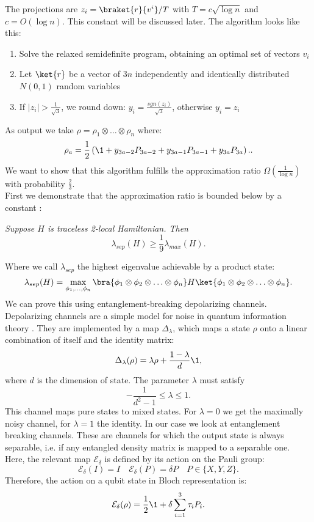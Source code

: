 The projections are $z_i=\braket{r}{v^i}/T$ with $T=c\sqrt{\log{}n}$ and $c=O(\log{}n)$.
This constant will be discussed later.
The algorithm looks like this:
\begin{enumerate}
	\item Solve the relaxed semidefinite program, obtaining an optimal set of vectors $v_i$
	\item Let $\ket{r}$ be a vector of $3n$ independently and identically distributed $N(0,1)$ random variables
	\item If $|z_i|>\frac{1}{\sqrt{3}}$, we round down: $y_i=\frac{sgn(z_i)}{\sqrt{3}}$, otherwise $y_i=z_i$
\end{enumerate}
As output we take $ \rho=\rho_1\otimes\ldots\otimes\rho_n$ where:\[
	\rho_a=\frac{1}{2}\left(\1 +y_{3a-2}P_{3a-2}+y_{3a-1}P_{3a-1}+y_{3a}P_{3a}\right).
.\]
We want to show that this algorithm fulfills the approximation ratio $\Omega(\frac{1}{\log{}n})$ with probability $\frac{2}{3}$.\\
First we demonstrate that the approximation ratio is bounded below by a constant \cite{lieb73}:
\begin{thm}\emph{
	Suppose $H$ is traceless 2-local Hamiltonian. Then \[
	\lambda_{sep}(H)\ge \frac{1}{9}\lambda_{max}(H)
.\]}
\end{thm}
Where we call $\lambda_{sep}$ the highest eigenvalue achievable by a product state: \[
	\lambda_{sep}(H)=\max_{\phi_1,\ldots,\phi_n}\bra{\phi_1\otimes\phi_2\otimes\ldots\otimes\phi_n}H\ket{\phi_1\otimes\phi_2\otimes\ldots\otimes\phi_n}
.\]
We can prove this using entanglement-breaking depolarizing channels.
Depolarizing channels are a simple model for noise in quantum information theory \cite{nielsen11}.
They are implemented by a map $\Delta_{\lambda}$, which maps a state  $\rho$ onto a linear combination of itself and the identity matrix:\cite{king02}\[
	\Delta_{\lambda}(\rho)=\lambda\rho+\frac{1-\lambda}{d}\1,
\]
where $d$ is the dimension of state. The parameter $\lambda$ must satisfy \[
	-\frac{1}{d^2-1}\le\lambda\le 1
.\]
This channel maps pure states to mixed states.
For $\lambda=0$ we get the maximally noisy channel, for $\lambda=1$ the identity.
In our case we look at entanglement breaking channels.
These are channels for which the output state is always separable, i.e. if any entangled density matrix is mapped to a separable one.\cite{horodecki03}
Here, the relevant map $\mathcal{E}_{\delta}$ is defined by its action on the Pauli group: \[
	\mathcal{E}_{\delta}(I)=I\quad\mathcal{E}_{\delta}(P)=\delta P\quad P\in \{X,Y,Z\}
.\]
Therefore, the action on a qubit state in Bloch representation is: \[
	\mathcal{E}_{\delta}(\rho) =  \frac{1}{2}\1 + \delta \sum_{i=1}^{3} \tau_i P_i
.\]
